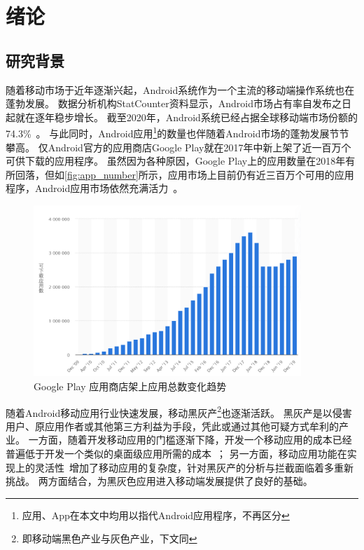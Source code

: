 \chapter {绪论}
\label{chp:intro}

\section{研究背景}

随着移动市场于近年逐渐兴起，Android系统作为一个主流的移动端操作系统也在蓬勃发展。
数据分析机构StatCounter资料显示，Android市场占有率自发布之日起就在逐年稳步增长。
截至2020年，Android系统已经占据全球移动端市场份额的74.3\%~\cite{MobileOSMktShare}。
与此同时，Android应用\footnote{应用、App在本文中均用以指代Android应用程序，不再区分}的数量也伴随着Android市场的蓬勃发展节节攀高。
仅Android官方的应用商店Google Play就在2017年中新上架了近一百万个可供下载的应用程序。
虽然因为各种原因，Google Play上的应用数量在2018年有所回落，但如\autoref{fig:app_number}所示，应用市场上目前仍有近三百万个可用的应用程序，Android应用市场依然充满活力~\cite{StatistaAppNumber}。

\begin{figure}[htbp]
	\centering
	\includegraphics[width=0.9\textwidth]{./Figures/edwin-intro-app-number.png}
	\caption{Google Play 应用商店架上应用总数变化趋势}
	\label{fig:app_number}
\end{figure}

随着Android移动应用行业快速发展，移动黑灰产\footnote{即移动端黑色产业与灰色产业，下文同}也逐渐活跃。
黑灰产是以侵害用户、原应用作者或其他第三方利益为手段，凭此或通过其他可疑方式牟利的产业。
一方面，随着开发移动应用的门槛逐渐下降，开发一个移动应用的成本已经普遍低于开发一个类似的桌面级应用所需的成本~\cite{wasserman2010software}；
另一方面，移动应用功能在实现上的灵活性~\cite{storydroid}增加了移动应用的复杂度，针对黑灰产的分析与拦截面临着多重新挑战。
两方面结合，为黑灰色应用进入移动端发展提供了良好的基础。

